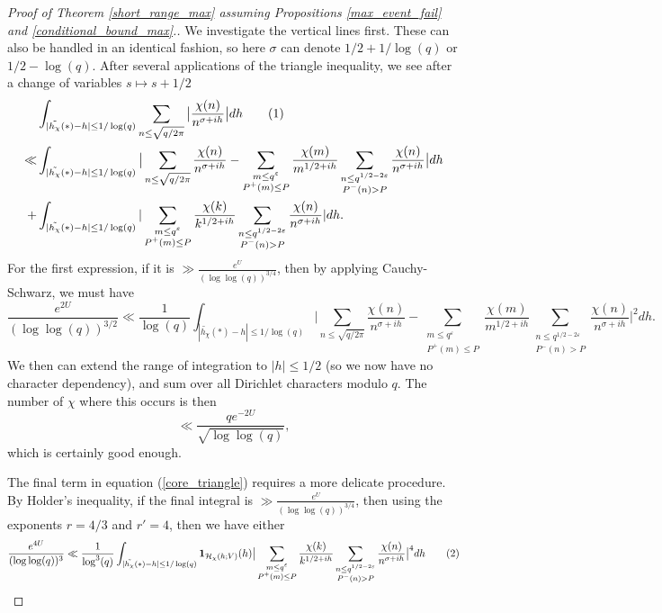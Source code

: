 \documentclass[reqno]{amsart}
\theoremstyle{definition}
\theoremstyle{remark}
\numberwithin{equation}{section}
\newcommand\numberthis{\addtocounter{equation}{1}\tag{\theequation}}
\theoremstyle{remark}
\begin{document}
\begin{proof}[Proof of Theorem \ref{short_range_max} assuming Propositions \ref{max_event_fail} and \ref{conditional_bound_max}.]
    We investigate the vertical lines first. These can also be handled in an identical fashion, so here $\sigma$ can denote $1/2+1/\log(q)$ or $1/2-\log(q)$. After several applications of the triangle inequality, we see after a change of variables $s \mapsto s+1/2$
    \begin{align*}
        &\int_{|\tilde{h_\chi}(*)-h| \leq 1/\log(q)}\sum_{n \leq \sqrt{q/2\pi}}\big|\frac{\chi(n)}{n^{\sigma+ih}}\big|dh  \numberthis \label{core_triangle}\\ 
        \ll& \int_{|\tilde{h_\chi}(*)-h| \leq 1/\log(q)}\big|\sum_{n \leq \sqrt{q/2\pi}}\frac{\chi(n)}{n^{\sigma+ih}}-\sum_{\substack{m \leq q^{\varepsilon} \\ P^+(m) \leq P}}\frac{\chi(m)}{m^{1/2+ih}}\sum_{\substack{n \leq q^{1/2-2\varepsilon} \\ P^-(n) > P}}\frac{\chi(n)}{n^{\sigma+ih}}\big|dh \\
        +& \int_{|\tilde{h_\chi}(*)-h| \leq 1/\log(q)}|\sum_{\substack{m \leq q^{\varepsilon} \\  P^+(m) \leq P}}\frac{\chi(k)}{k^{1/2+ih}}\sum_{\substack{n \leq q^{1/2-2\varepsilon} \\ P^{-}(n) > P}}\frac{\chi(n)}{n^{\sigma+ih}}|dh.
    \end{align*}
    For the first expression, if it is $\gg \frac{e^{U}}{(\log\log(q))^{3/4}}$, then by applying Cauchy-Schwarz, we must have
    $$\frac{e^{2U}}{(\log\log(q))^{3/2}} \ll \frac{1}{\log(q)}\int_{|\tilde{h_\chi}(*)-h| \leq 1/\log(q)}\big|\sum_{n \leq \sqrt{q/2\pi}}\frac{\chi(n)}{n^{\sigma+ih}}-\sum_{\substack{m \leq q^{\varepsilon} \\ P^+(m) \leq P}}\frac{\chi(m)}{m^{1/2+ih}}\sum_{\substack{n \leq q^{1/2-2\varepsilon} \\ P^-(n) > P}}\frac{\chi(n)}{n^{\sigma+ih}}\big|^2dh.$$
    We then can extend the range of integration to $|h| \leq 1/2$ (so we now have no character dependency), and sum over all Dirichlet characters modulo $q$. The number of $\chi$ where this occurs is then
    $$\ll \frac{qe^{-2U}}{\sqrt{\log\log(q)}},$$
    which is certainly good enough. \par
    The final term in equation (\ref{core_triangle}) requires a more delicate procedure. By Holder's inequality, if the final integral is $\gg \frac{e^{U}}{(\log\log(q))^{3/4}}$, then using the exponents $r=4/3$ and $r'=4$, then we have either
    \begin{align*}
        \frac{e^{4U}}{(\log\log(q))^3} \ll  \frac{1}{\log^3(q)}\int_{|\tilde{h_\chi}(*)-h| \leq 1/\log(q)}\mathbf{1}_{\mathcal{H}_\chi(h;V)}(h)\big|\sum_{\substack{m \leq q^\varepsilon \\ P^+(m) \leq P}}\frac{\chi(k)}{k^{1/2+ih}}\sum_{\substack{n \leq q^{1/2-2\varepsilon} \\ P^{-}(n) > P}}\frac{\chi(n)}{n^{\sigma+ih}}\big|^4dh \numberthis \label{small_dirichlet}

\end{align*}
\end{proof}
\end{document}
